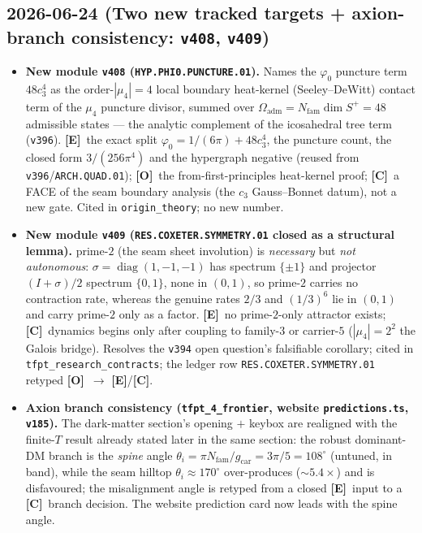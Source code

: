 \documentclass[11pt]{article}
\providecommand{\mE}{\textbf{[E]}}\providecommand{\mC}{\textbf{[C]}}
\providecommand{\mO}{\textbf{[O]}}\providecommand{\mX}{\textbf{[X]}}
\providecommand{\vref}[1]{\texttt{#1}}
\providecommand{\gcar}{g_{\mathrm{car}}}\providecommand{\Nfam}{N_{\mathrm{fam}}}
\begin{document}
\subsection*{2026-06-24 (Two new tracked targets + axion-branch consistency: \texttt{v408}, \texttt{v409})}
\begin{itemize}
\item \textbf{New module \texttt{v408} (\texttt{HYP.PHI0.PUNCTURE.01}).} Names the $\varphi_0$ puncture term
$48c_3^4$ as the order-$|\mu_4|{=}4$ local boundary heat-kernel (Seeley--DeWitt) contact term of the $\mu_4$
puncture divisor, summed over $\Omega_{\mathrm{adm}}{=}\Nfam\dim S^+{=}48$ admissible states --- the analytic
complement of the icosahedral tree term (\vref{v396}). \mE\ the exact split $\varphi_0{=}1/(6\pi){+}48c_3^4$,
the puncture count, the closed form $3/(256\pi^4)$ and the hypergraph negative (reused from
\vref{v396}/\texttt{ARCH.QUAD.01}); \mO\ the from-first-principles heat-kernel proof; \mC\ a FACE of the seam
boundary analysis (the $c_3$ Gauss--Bonnet datum), not a new gate. Cited in \texttt{origin\_theory}; no new number.
\item \textbf{New module \texttt{v409} (\texttt{RES.COXETER.SYMMETRY.01} closed as a structural lemma).} prime-$2$
(the seam sheet involution) is \emph{necessary} but \emph{not autonomous}: $\sigma{=}\operatorname{diag}(1,-1,-1)$
has spectrum $\{\pm1\}$ and projector $(I{+}\sigma)/2$ spectrum $\{0,1\}$, none in $(0,1)$, so prime-$2$ carries
no contraction rate, whereas the genuine rates $2/3$ and $(1/3)^6$ lie in $(0,1)$ and carry prime-$2$ only as a
factor. \mE\ no prime-$2$-only attractor exists; \mC\ dynamics begins only after coupling to family-$3$ or
carrier-$5$ ($|\mu_4|{=}2^2$ the Galois bridge). Resolves the \vref{v394} open question's falsifiable corollary;
cited in \texttt{tfpt\_research\_contracts}; the ledger row \texttt{RES.COXETER.SYMMETRY.01} retyped \mO\ $\to$ \mE/\mC.
\item \textbf{Axion branch consistency (\texttt{tfpt\_4\_frontier}, website \texttt{predictions.ts}, \vref{v185}).}
The dark-matter section's opening $+$ keybox are realigned with the finite-$T$ result already stated later in the
same section: the robust dominant-DM branch is the \emph{spine} angle $\theta_i{=}\pi\Nfam/\gcar{=}3\pi/5{=}108^\circ$
(untuned, in band), while the seam hilltop $\theta_i{\approx}170^\circ$ over-produces ($\sim5.4\times$) and is
disfavoured; the misalignment angle is retyped from a closed \mE\ input to a \mC\ branch decision. The website
prediction card now leads with the spine angle.

\end{itemize}
\end{document}
